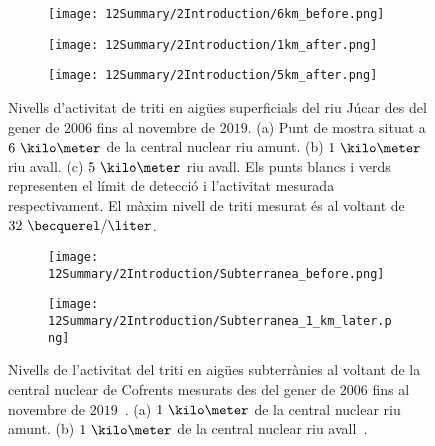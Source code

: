 \begin{figure}
\centering
    \begin{subfigure}[b]{0.7\textwidth}
    \centering
    \texttt{[image: 12Summary/2Introduction/6km\_before.png]}  
    \caption{\label{subfig:TritiL6kB}}
    \end{subfigure}
    \hfill
    \begin{subfigure}[b]{0.7\textwidth}
    \centering
    \texttt{[image: 12Summary/2Introduction/1km\_after.png]}  
    \caption{\label{subfig:TritiL1kA}}
    \end{subfigure}
    \hfill
    \begin{subfigure}[b]{0.7\textwidth}
    \centering
    \texttt{[image: 12Summary/2Introduction/5km\_after.png]}  
    \caption{\label{subfig:TritiL5kA}}
    \end{subfigure}
 \caption{Nivells d'activitat de triti en aigües superficials del riu Júcar des del gener de $2006$ fins al novembre de $2019$. (a) Punt de mostra situat a $6~\kilo\meter$ de la central nuclear riu amunt. (b) $1~\kilo\meter$ riu avall. (c) $5~\kilo\meter$ riu avall. Els punts blancs i verds representen el límit de detecció i l'activitat mesurada respectivament. El màxim nivell de triti mesurat és al voltant de $32~\becquerel/\liter$.~\cite{REM}}
 \label{fig:MesuresSuperficialsCofrents}
\end{figure}

\begin{figure}
\centering
    \begin{subfigure}[b]{0.9\textwidth}
    \centering
    \texttt{[image: 12Summary/2Introduction/Subterranea\_before.png]}  
    \caption{\label{subfig:TritiLG1kB}}
    \end{subfigure}
    \hfill
    \begin{subfigure}[b]{0.9\textwidth}
    \centering
    \texttt{[image: 12Summary/2Introduction/Subterranea\_1\_km\_later.png]}  
    \caption{\label{subfig:TritiLG1kA}}
    \end{subfigure}
 \caption{Nivells de l'activitat del triti en aigües subterrànies al voltant de la central nuclear de Cofrents mesurats des del gener de $2006$ fins al novembre de $2019$~\cite{REM}. (a) $1~\kilo\meter$ de la central nuclear riu amunt. (b) $1~\kilo\meter$ de la central nuclear riu avall~\cite{REM}.}
 \label{fig:MesuresSuperterraniesCofrents}
\end{figure}

